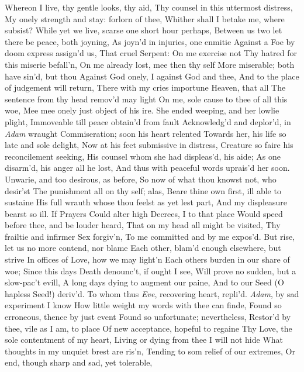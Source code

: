 \documentclass[11pt]{book}
\newcounter {first}
\begin{document}
Whereon I live, thy gentle looks, thy aid, 
Thy counsel in this uttermost distress, 
My onely strength and stay: forlorn of thee, 
Whither shall I betake me, where subsist? 
While yet we live, scarse one short hour perhaps, 
Between us two let there be peace, both joyning, 
As joyn'd in injuries, one enmitie 
Against a Foe by doom express assign'd us, 
That cruel Serpent: On me exercise not 
Thy hatred for this miserie befall'n, 
On me already lost, mee then thy self 
More miserable; both have sin'd, but thou 
Against God onely, I against God and thee, 
And to the place of judgement will return, 
There with my cries importune Heaven, that all 
The sentence from thy head remov'd may light 
On me, sole cause to thee of all this woe, 
Mee mee onely just object of his ire. 
\quad She ended weeping, and her lowlie plight, 
Immoveable till peace obtain'd from fault 
Acknowledg'd and deplor'd, in \textit{Adam} wraught 
Commiseration; soon his heart relented 
Towards her, his life so late and sole delight, 
Now at his feet submissive in distress, 
Creature so faire his reconcilement seeking, 
His counsel whom she had displeas'd, his aide; 
As one disarm'd, his anger all he lost, 
And thus with peaceful words uprais'd her soon. 
\quad Unwarie, and too desirous, as before, 
So now of what thou knowst not, who desir'st 
The punishment all on thy self; alas, 
Beare thine own first, ill able to sustaine 
His full wrauth whose thou feelst as yet lest part, 
And my displeasure bearst so ill.  If Prayers 
Could alter high Decrees, I to that place 
Would speed before thee, and be louder heard, 
That on my head all might be visited, 
Thy frailtie and infirmer Sex forgiv'n, 
To me committed and by me expos'd. 
But rise, let us no more contend, nor blame 
Each other, blam'd enough elsewhere, but strive 
In offices of Love, how we may light'n 
Each others burden in our share of woe; 
Since this days Death denounc't, if ought I see, 
Will prove no sudden, but a slow-pac't evill, 
A long days dying to augment our paine, 
And to our Seed (O hapless Seed!) deriv'd. 
\quad To whom thus \textit{Eve}, recovering heart, repli'd. 
\textit{Adam}, by sad experiment I know 
How little weight my words with thee can finde, 
Found so erroneous, thence by just event 
Found so unfortunate; nevertheless, 
Restor'd by thee, vile as I am, to place 
Of new acceptance, hopeful to regaine 
Thy Love, the sole contentment of my heart, 
Living or dying from thee I will not hide 
What thoughts in my unquiet brest are ris'n, 
Tending to som relief of our extremes, 
Or end, though sharp and sad, yet tolerable, 
\end{document}
